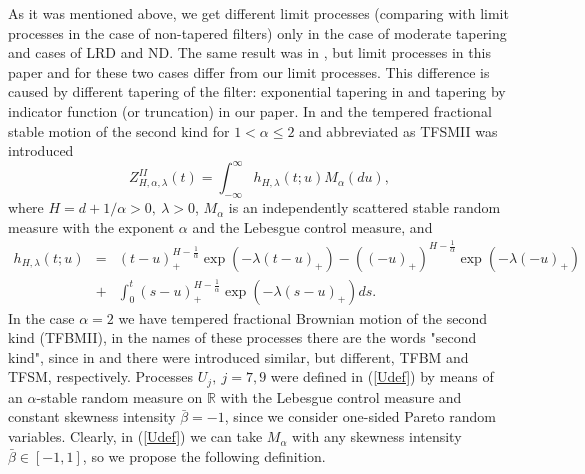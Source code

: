 \documentclass[12pt]{article}
\def\bbr{{\mathbb R}}
\def\a{\alpha}
\def\b{\beta}
\def\l{\lambda}
\def\H{{\mathscr H}}
\theoremstyle{plain}
\theoremstyle{definition}
\begin{document}
As it was mentioned above, we get different limit processes (comparing with limit processes in the case of non-tapered filters) only in the case of moderate tapering and cases of LRD and ND. The same result was in \cite{Sabzikar}, but limit processes in this paper and for these two cases differ from our limit processes. This difference is caused by different tapering of the filter: exponential tapering  in  \cite{Sabzikar} and tapering by indicator function (or truncation) in our paper.
In \cite{Sabzikar} and \cite{Sabzikar2} the tempered fractional stable motion of the second kind for $1<\a\le 2$ and abbreviated as TFSMII was introduced
\begin{equation}\label{TFSMII}
Z_{H, \a, \l}^{II}(t)=\int_{-\infty}^{\infty} h_{H, \l} (t; u) M_{\a}(du),
\end{equation}
where $H=d+1/\a>0, \ \l> 0$, $M_\a$ is an independently scattered stable random measure with the exponent $\a$ and the Lebesgue control  measure, and
\begin{eqnarray*}
h_{H, \l} (t; u) &=& (t-u)_+^{H-\frac{1}{\a}}\exp (-\l (t-u)_+)- ((-u)_+)^{H-\frac{1}{\a}}\exp (-\l (-u)_+) \\
   & + & \int_0^t (s-u)_+^{H-\frac{1}{\a}}\exp (-\l (s-u)_+) ds.
\end{eqnarray*}
 In the case $\a=2$ we have tempered fractional Brownian motion of the second kind (TFBMII), in the names of these processes there are the words "second kind", since in \cite{Sabzikar1} and \cite{Sabzikar3} there were introduced similar, but different, TFBM and TFSM, respectively.
%
Processes $U_j, \ j=7,9$ were defined in (\ref{Udef}) by means of an $\a$-stable random measure on $\bbr$ with the Lebesgue control measure and constant skewness intensity ${\bar \b}=-1$, since we consider one-sided Pareto random variables. Clearly, in (\ref{Udef}) we can take $M_\a$ with any skewness intensity ${\bar \b}\in [-1, 1]$, so we propose the following definition.
\end{document}
